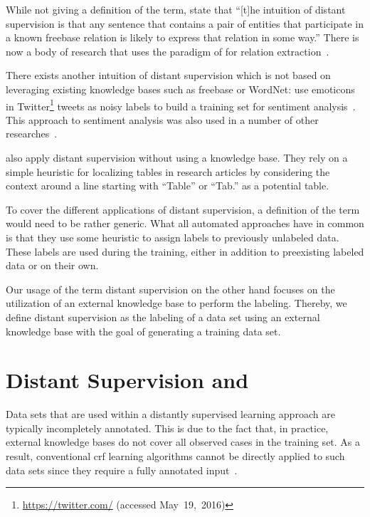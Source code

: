 While not giving a definition of the term, \citet[p.~2]{mintz2009distant} state that ``[t]he intuition of distant supervision is that any sentence that contains a pair of entities that participate in a known \gls{freebase} relation is likely to express that relation in some way.''
There is now a body of research that uses the paradigm of \citet{mintz2009distant} for relation extraction~\citep{benson2011event,ritter2011named,nguyen2011end,takamatsu2012reducing,xu2013filling}.

\bigskip

There exists another intuition of \gls{distant supervision} which is not based on leveraging existing knowledge bases such as \gls{freebase} or WordNet:
\citet{go2009twitter} use emoticons in Twitter\footnote{\url{https://twitter.com/} (accessed May~19,~2016)} tweets as noisy labels to build a training set for sentiment analysis~\citep{go2009twitter}.
This approach to sentiment analysis was also used in a number of other researches~\citep{purver2012experimenting,marchetti2012learning,suttles2013distant}.

\citet{fan2015detecting} also apply distant supervision without using a knowledge base.
They rely on a simple heuristic for localizing tables in research articles by considering the context around a line starting with ``Table'' or ``Tab.'' as a potential table.

\bigskip

To cover the different applications of \gls{distant supervision}, a definition of the term would need to be rather generic.
What all automated approaches have in common is that they use some heuristic to assign labels to previously unlabeled data. These labels are used during the training, either in addition to preexisting labeled data or on their own.

Our usage of the term \gls{distant supervision} on the other hand focuses on the utilization of an external knowledge base to perform the labeling.
Thereby, we define \gls{distant supervision} as the labeling of a data set using an external knowledge base with the goal of generating a training data set.

\section{Distant Supervision and }\label{sec:distant-supervision-and-crfs}

Data sets that are used within a distantly supervised learning approach are typically incompletely annotated.
This is due to the fact that, in practice, external knowledge bases do not cover all observed cases in the training set.
As a result, conventional \gls{crf} learning algorithms cannot be directly applied to such data sets since they require a fully annotated input~\citep{tsuboi2008training}.

